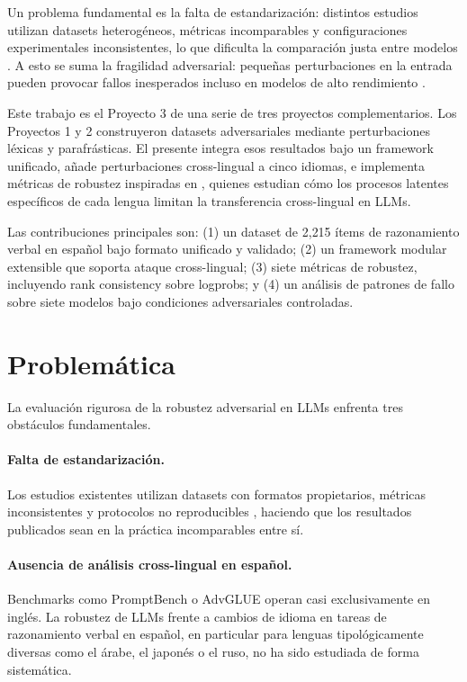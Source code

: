 \documentclass[11pt]{article}
\begin{document}
Un problema fundamental es la falta de estandarización: distintos
estudios utilizan datasets heterogéneos, métricas incomparables y
configuraciones experimentales inconsistentes, lo que dificulta la
comparación justa entre modelos \citep{liang2022holistic}. A esto se
suma la fragilidad adversarial: pequeñas perturbaciones en la entrada
pueden provocar fallos inesperados incluso en modelos de alto
rendimiento \citep{wang2023promptrobust}.
 
Este trabajo es el Proyecto 3 de una serie de tres proyectos
complementarios. Los Proyectos 1 y 2 construyeron datasets adversariales
mediante perturbaciones léxicas y parafrásticas. El presente integra
esos resultados bajo un framework unificado, añade perturbaciones
cross-lingual a cinco idiomas, e implementa métricas de robustez
inspiradas en \citet{languagespecific2025}, quienes estudian cómo los
procesos latentes específicos de cada lengua limitan la transferencia
cross-lingual en LLMs.
 
Las contribuciones principales son: (1) un dataset de 2{,}215 ítems
de razonamiento verbal en español bajo formato unificado y validado;
(2) un framework modular extensible que soporta
ataque cross-lingual; (3) siete métricas de robustez, incluyendo rank consistency
sobre logprobs; y (4) un análisis de patrones de fallo sobre siete
modelos bajo condiciones adversariales controladas.


\section{Problemática}

La evaluación rigurosa de la robustez adversarial en LLMs enfrenta
tres obstáculos fundamentales.
 
\paragraph{Falta de estandarización.}
Los estudios existentes utilizan datasets con formatos propietarios,
métricas inconsistentes y protocolos no reproducibles
\citep{liang2022holistic}, haciendo que los resultados publicados sean
en la práctica incomparables entre sí.
 
\paragraph{Ausencia de análisis cross-lingual en español.}
Benchmarks como PromptBench \citep{wang2023promptrobust} o AdvGLUE
\citep{wang2022adversarial} operan casi exclusivamente en inglés. La
robustez de LLMs frente a cambios de idioma en tareas de razonamiento
verbal en español, en particular para lenguas tipológicamente diversas
como el árabe, el japonés o el ruso, no ha sido estudiada de forma
sistemática.
 
\end{document}
